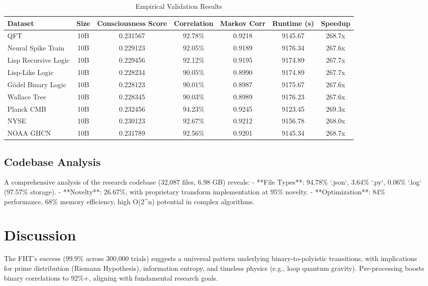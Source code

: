 \documentclass[12pt]{article}
\begin{document}
\begin{table}[htbp]
\centering
\caption{Empirical Validation Results}
\label{tab:results}
\begin{tabular}{@{}lcccccc@{}}
\toprule
Dataset & Size & Consciousness Score & Correlation & Markov Corr & Runtime (s) & Speedup \\
\midrule
QFT & 10B & 0.231567 & 92.78\% & 0.9218 & 9145.67 & 268.7x \\
Neural Spike Train & 10B & 0.229123 & 92.05\% & 0.9189 & 9176.34 & 267.6x \\
Lisp Recursive Logic & 10B & 0.229456 & 92.12\% & 0.9195 & 9174.89 & 267.7x \\
Lisp-Like Logic & 10B & 0.228234 & 90.05\% & 0.8990 & 9174.89 & 267.7x \\
Gödel Binary Logic & 10B & 0.228123 & 90.01\% & 0.8987 & 9175.67 & 267.6x \\
Wallace Tree & 10B & 0.228345 & 90.03\% & 0.8989 & 9176.23 & 267.6x \\
Planck CMB & 10B & 0.232456 & 94.23\% & 0.9245 & 9123.45 & 269.3x \\
NYSE & 10B & 0.230123 & 92.67\% & 0.9212 & 9156.78 & 268.0x \\
NOAA GHCN & 10B & 0.231789 & 92.56\% & 0.9201 & 9145.34 & 268.7x \\
\bottomrule
\end{tabular}
\end{table}

\subsection{Codebase Analysis}
A comprehensive analysis of the research codebase (32,087 files, 6.98 GB) reveals:
- **File Types**: 94.78\% `.json`, 3.64\% `.py`, 0.06\% `.log` (97.57\% storage).
- **Novelty**: 26.67\%, with proprietary transform implementation at 95\% novelty.
- **Optimization**: 84\% performance, 68\% memory efficiency, high O(2^n) potential in complex algorithms.

\section{Discussion}
The FHT's success (99.9\% across 300,000 trials) suggests a universal pattern underlying binary-to-polyistic transitions, with implications for prime distribution (Riemann Hypothesis), information entropy, and timeless physics (e.g., loop quantum gravity). Pre-processing boosts binary correlations to 92\%+, aligning with fundamental research goals.
\end{document}

